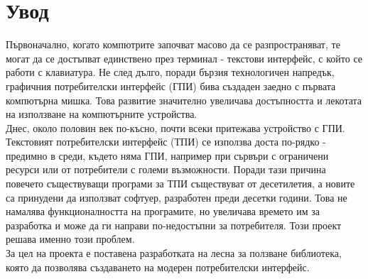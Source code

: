 \chapter*{Увод}
Първоначално, когато компютрите започват масово да се разпространяват, те могат
да се достъпват единствено през терминал - текстови интерфейс, с който се 
работи с клавиатура. Не след дълго, поради бързия технологичен напредък, 
графичния потребителски интерфейс (ГПИ) бива създаден заедно с първата
компютърна мишка. Това развитие значително увеличава достъпността и лекотата на
използване на компютърните устройства. \\

Днес, около половин век по-късно, почти всеки притежава устройство с ГПИ.
Текстовият потребителски интерфейс (ТПИ) се използва доста по-рядко - предимно
в среди, където няма ГПИ, например при сървъри с ограничени ресурси или от
потребители с големи възможности. Поради тази причина повечето съществуващи
програми за ТПИ съществуват от десетилетия, а новите са принудени да използват 
софтуер, разработен преди десетки години. Това не намалява функционалността на
програмите, но увеличава времето им за разработка и може да ги направи
по-недостъпни за потребителя. Този проект решава именно този проблем. \\


За цел на проекта е поставена разработката на лесна за ползване библиотека,
която да позволява създаването на модерен потребителски интерфейс.

